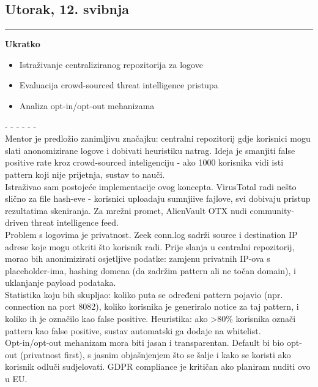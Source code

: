 \documentclass[12pt, a4paper]{article}
\newcommand{\dan}[1]{
    \subsection*{#1}
    \vspace{-0.5em} 
    \hrule \vspace{0.5em} 
}
\begin{document}
\dan{Utorak, 12. svibnja}
\textbf{Ukratko}
\begin{itemize}
    \item Istraživanje centraliziranog repozitorija za logove
    \item Evaluacija crowd-sourced threat intelligence pristupa
    \item Analiza opt-in/opt-out mehanizama
\end{itemize}
- - - - - - \\
Mentor je predložio zanimljivu značajku: centralni repozitorij gdje korisnici mogu slati anonomizirane logove i dobivati heuristiku natrag. Ideja je smanjiti false positive rate kroz crowd-sourced inteligenciju - ako 1000 korisnika vidi isti pattern koji nije prijetnja, sustav to nauči.
\\
Istraživao sam postojeće implementacije ovog koncepta. VirusTotal radi nešto slično za file hash-eve - korisnici uploadaju sumnjiive fajlove, svi dobivaju pristup rezultatima skeniranja. Za mrežni promet, AlienVault OTX nudi community-driven threat intelligence feed.
\\
Problem s logovima je privatnost. Zeek conn.log sadrži source i destination IP adrese koje mogu otkriti što korisnik radi. Prije slanja u centralni repozitorij, morao bih anonimizirati osjetljive podatke: zamjenu privatnih IP-ova s placeholder-ima, hashing domena (da zadržim pattern ali ne točan domain), i uklanjanje payload podataka.
\\
Statistika koju bih skupljao: koliko puta se određeni pattern pojavio (npr. connection na port 8082), koliko korisnika je generiralo notice za taj pattern, i koliko ih je označilo kao false positive. Heuristika: ako >80\% korisnika označi pattern kao false positive, sustav automatski ga dodaje na whitelist.
\\
Opt-in/opt-out mehanizam mora biti jasan i transparentan. Default bi bio opt-out (privatnost first), s jasnim objašnjenjem što se šalje i kako se koristi ako korisnik odluči sudjelovati. GDPR compliance je kritičan ako planiram nuditi ovo u EU.
\end{document}

